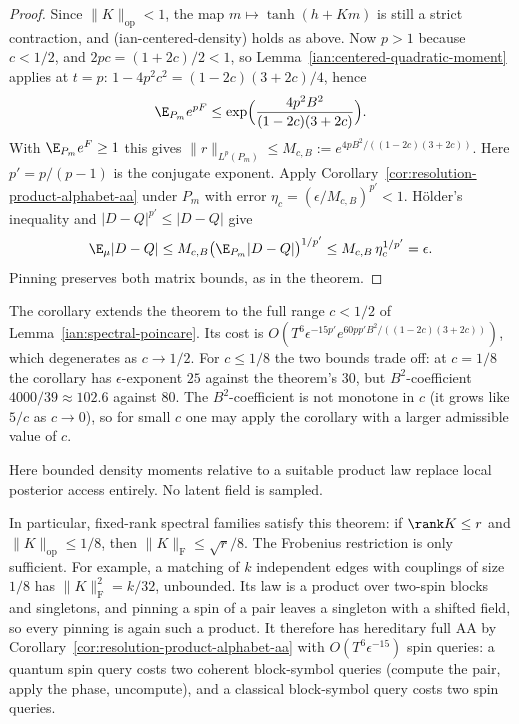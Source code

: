 \begin{proof}
Since \(\|K\|_{\mathrm{op}}<1\), the map \(m\mapsto\tanh(h+Km)\) is
still a strict contraction, and (ian-centered-density) holds as above.
Now \(p>1\) because \(c<1/2\), and \(2pc=(1+2c)/2<1\), so
Lemma~\ref{ian:centered-quadratic-moment} applies at \(t=p\):
\(1-4p^2c^2=(1-2c)(3+2c)/4\), hence
\[
 \E_{P_m}e^{pF}\le\exp\Bigl(\frac{4p^2B^2}{(1-2c)(3+2c)}\Bigr).
\]
With \(\E_{P_m}e^F\ge1\) this gives
\(\|r\|_{L^p(P_m)}\le M_{c,B}:=e^{4pB^2/((1-2c)(3+2c))}\). Here
\(p'=p/(p-1)\) is the conjugate exponent. Apply
Corollary~\ref{cor:resolution-product-alphabet-aa} under \(P_m\) with
error \(\eta_c=(\epsilon/M_{c,B})^{p'}<1\). H\"older's inequality and
\(|D-Q|^{p'}\le|D-Q|\) give
\[
 \E_\mu|D-Q|\le M_{c,B}\bigl(\E_{P_m}|D-Q|\bigr)^{1/p'}
 \le M_{c,B}\,\eta_c^{1/p'}=\epsilon.
\]
Pinning preserves both matrix bounds, as in the theorem.
\end{proof}

The corollary extends the theorem to the full range \(c<1/2\) of
Lemma~\ref{ian:spectral-poincare}. Its cost is
\(O(T^6\epsilon^{-15p'}e^{60pp'B^2/((1-2c)(3+2c))})\), which degenerates
as \(c\to1/2\). For \(c\le1/8\) the two bounds trade off: at \(c=1/8\)
the corollary has \(\epsilon\)-exponent \(25\) against the theorem's
\(30\), but \(B^2\)-coefficient \(4000/39\approx102.6\) against \(80\).
The \(B^2\)-coefficient is not monotone in \(c\) (it grows like \(5/c\)
as \(c\to0\)), so for small \(c\) one may apply the corollary with a
larger admissible value of \(c\).

Here bounded density moments relative to a suitable product law replace
local posterior access entirely. No latent field is sampled.

In particular, fixed-rank spectral families satisfy this theorem:
if \(\rank K\le r\) and \(\|K\|_{\mathrm{op}}\le1/8\), then
\(\|K\|_{\mathrm F}\le\sqrt r/8\). The Frobenius restriction is only
sufficient. For example, a matching of \(k\) independent edges with
couplings of size \(1/8\) has \(\|K\|_{\mathrm F}^2=k/32\), unbounded.
Its law is a product over two-spin blocks and singletons, and pinning
a spin of a pair leaves a singleton with a shifted field, so every
pinning is again such a product. It therefore has hereditary full AA by
Corollary~\ref{cor:resolution-product-alphabet-aa} with
\(O(T^6\epsilon^{-15})\) spin queries: a quantum spin query costs two
coherent block-symbol queries (compute the pair, apply the phase,
uncompute), and a classical block-symbol query costs two spin queries.

